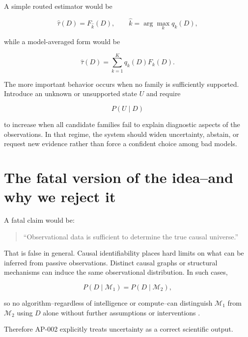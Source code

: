 \documentclass[11pt]{article}
\begin{document}
A simple routed estimator would be

\begin{equation}
\hat\tau(D)=F_{\hat k}(D),
\qquad
\hat k=\arg\max_k q_k(D),
\end{equation}

while a model-averaged form would be

\begin{equation}
\hat\tau(D)=\sum_{k=1}^{K} q_k(D)F_k(D).
\end{equation}

The more important behavior occurs when no family is sufficiently supported. Introduce an unknown or unsupported state $U$ and require

\begin{equation}
P(U\mid D)
\end{equation}

to increase when all candidate families fail to explain diagnostic aspects of the observations. In that regime, the system should widen uncertainty, abstain, or request new evidence rather than force a confident choice among bad models.

\section{The fatal version of the idea--and why we reject it}

A fatal claim would be:

\begin{quote}
``Observational data is sufficient to determine the true causal universe.''
\end{quote}

That is false in general. Causal identifiability places hard limits on what can be inferred from passive observations. Distinct causal graphs or structural mechanisms can induce the same observational distribution. In such cases,

\begin{equation}
P(D\mid\mathcal{M}_1)=P(D\mid\mathcal{M}_2),
\end{equation}

so no algorithm--regardless of intelligence or compute--can distinguish $\mathcal{M}_1$ from $\mathcal{M}_2$ using $D$ alone without further assumptions or interventions \cite{pearl2009,peters2017}.

Therefore AP-002 explicitly treats uncertainty as a correct scientific output.
\end{document}
